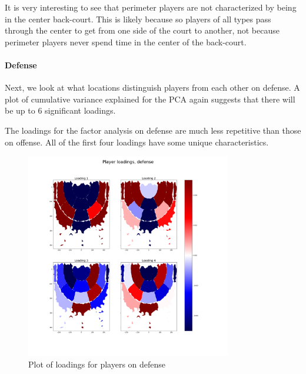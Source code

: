 \documentclass[]{article}
\let\oldparagraph\paragraph
\renewcommand{\paragraph}[1]{\oldparagraph{#1}\mbox{}}
\begin{document}
It is very interesting to see that perimeter players are not
characterized by being in the center back-court. This is likely because
so players of all types pass through the center to get from one side of
the court to another, not because perimeter players never spend time in
the center of the back-court.

\hypertarget{defense}{%
\paragraph{Defense}\label{defense}}

Next, we look at what locations distinguish players from each other on
defense. A plot of cumulative variance explained for the PCA again
suggests that there will be up to 6 significant loadings.

The loadings for the factor analysis on defense are much less repetitive
than those on offense. All of the first four loadings have some unique
characteristics.

\begin{figure}
\centering
\includegraphics[width=0.8\textwidth,height=\textheight]{first_4_loadings_players_def.png}
\caption{Plot of loadings for players on defense}
\end{figure}
\end{document}
